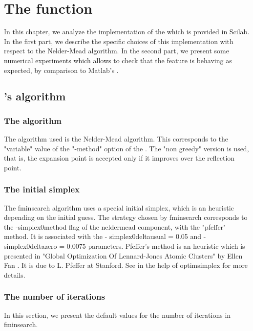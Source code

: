 \chapter{The  function}

In this chapter, we analyze the implementation of the 
which is provided in Scilab. In the first part, we describe the specific 
choices of this implementation with respect to the Nelder-Mead algorithm.
In the second part, we present some numerical experiments which 
allows to check that the feature is behaving as expected, by comparison 
to Matlab's .

\section{'s algorithm}

\subsection{The algorithm}

The algorithm used is the Nelder-Mead algorithm. This corresponds to the 
"variable" value of the "-method" option of the .
The "non greedy" version is used, that is, the expansion point is 
accepted only if it improves over the reflection point.

\subsection{The initial simplex}

The fminsearch algorithm uses a special initial simplex, which is an 
heuristic depending on the initial guess. The strategy chosen by 
fminsearch corresponds to the -simplex0method flag of the neldermead 
component, with the "pfeffer" method. It is associated with the -
simplex0deltausual = 0.05 and -simplex0deltazero = 0.0075 parameters. 
Pfeffer's method is an heuristic which is presented in "Global 
Optimization Of Lennard-Jones Atomic Clusters" by Ellen Fan \cite{Fan2002}. 
It is due to L. Pfeffer at Stanford. See in the help of optimsimplex for more 
details.

\subsection{The number of iterations}

In this section, we present the default values for the number of 
iterations in fminsearch.

